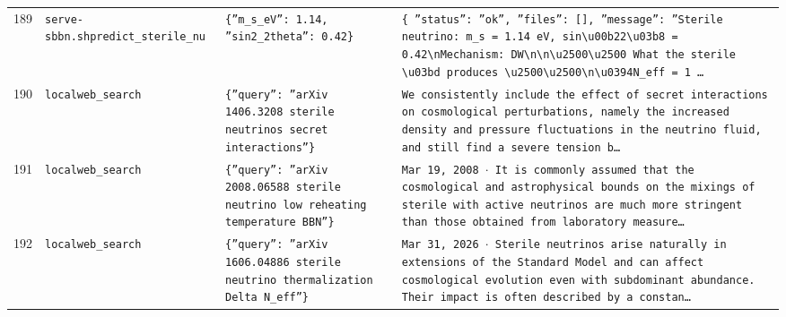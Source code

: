 \documentclass[11pt,a4paper]{article}
\begin{document}
\begin{longtable}{@{}p{}p{}p{}p{}@{}}
189 & \texttt{serve-sbbn.sh}\newline\texttt{predict\_\allowbreak{}sterile\_\allowbreak{}nu} & \texttt{\{''m\_\allowbreak{}s\_\allowbreak{}eV'':\allowbreak{} 1.14,\allowbreak{} ''sin2\_\allowbreak{}2theta'':\allowbreak{} 0.42\}\allowbreak{}} & \texttt{\{   ''status'':\allowbreak{} ''ok'',\allowbreak{}   ''files'':\allowbreak{} []\allowbreak{},\allowbreak{}   ''message'':\allowbreak{} ''Sterile neutrino:\allowbreak{} m\_\allowbreak{}s =\allowbreak{} 1.14 eV,\allowbreak{} sin\textbackslash{}\allowbreak{}u00b22\textbackslash{}\allowbreak{}u03b8 =\allowbreak{} 0.42\textbackslash{}\allowbreak{}nMechanism:\allowbreak{} DW\textbackslash{}\allowbreak{}n\textbackslash{}\allowbreak{}n\textbackslash{}\allowbreak{}u2500\textbackslash{}\allowbreak{}u2500 What the sterile \textbackslash{}\allowbreak{}u03bd produces \textbackslash{}\allowbreak{}u2500\textbackslash{}\allowbreak{}u2500\textbackslash{}\allowbreak{}n\textbackslash{}\allowbreak{}u0394N\_\allowbreak{}eff =\allowbreak{} 1 \ldots{}\allowbreak{}} \\
190 & \texttt{local}\newline\texttt{web\_\allowbreak{}search} & \texttt{\{''query'':\allowbreak{} ''arXiv 1406.3208 sterile neutrinos secret interactions''\}\allowbreak{}} & \texttt{We consistently include the effect of secret interactions on cosmological perturbations,\allowbreak{} namely the increased density and pressure fluctuations in the neutrino fluid,\allowbreak{} and still find a severe tension b\ldots{}\allowbreak{}} \\
191 & \texttt{local}\newline\texttt{web\_\allowbreak{}search} & \texttt{\{''query'':\allowbreak{} ''arXiv 2008.06588 sterile neutrino low reheating temperature BBN''\}\allowbreak{}} & \texttt{Mar 19,\allowbreak{} 2008 $\cdot$ It is commonly assumed that the cosmological and astrophysical bounds on the mixings of sterile with active neutrinos are much more stringent than those obtained from laboratory measure\ldots{}\allowbreak{}} \\
192 & \texttt{local}\newline\texttt{web\_\allowbreak{}search} & \texttt{\{''query'':\allowbreak{} ''arXiv 1606.04886 sterile neutrino thermalization Delta N\_\allowbreak{}eff''\}\allowbreak{}} & \texttt{Mar 31,\allowbreak{} 2026 $\cdot$ Sterile neutrinos arise naturally in extensions of the Standard Model and can affect cosmological evolution even with subdominant abundance. Their impact is often described by a constan\ldots{}\allowbreak{}} \\

\end{longtable}
\end{document}
